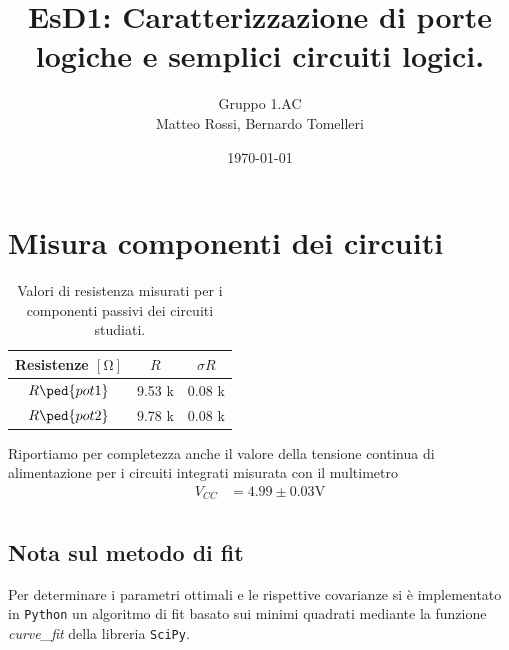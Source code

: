 \documentclass[10pt, a4paper, italian]{article}
\author{Gruppo 1.AC \\ Matteo Rossi, Bernardo Tomelleri}
\title{EsD1: Caratterizzazione di porte logiche e semplici circuiti logici.}
\begin{document}
\date{\today}
\maketitle

\setcounter{section}{0}

\section{Misura componenti dei circuiti}
\begin{table}[htbp]
\centering
\begin{tabular}{ccc}
\toprule
Resistenze $[\si{\ohm}]$ & $R$ & $\sigma R$ \\
\midrule
\midrule
$R\ped{pot1}$	& 9.53 k	& 0.08 k 		\\
$R\ped{pot2}$	& 9.78 k	& 0.08 k 		\\

\bottomrule     
\end{tabular}
\caption{Valori di resistenza misurati per i componenti passivi dei circuiti
studiati. \label{tab: rmesM}}
\end{table}

Riportiamo per completezza anche il valore della tensione continua di
alimentazione per i circuiti integrati misurata con il multimetro
\begin{align*}
V_{CC} &= 4.99 \pm 0.03 \si{\V} \\
\end{align*}

\subsection*{Nota sul metodo di fit}
Per determinare i parametri ottimali e le rispettive covarianze si \`e
implementato in \verb+Python+ un algoritmo di fit basato sui minimi quadrati
mediante la funzione \emph{curve\_fit} della libreria \texttt{SciPy}.

\end{document}
